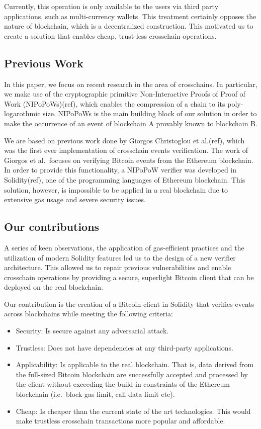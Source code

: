Currently, this operation is only available to the users via third party
applications, such as multi-currency wallets. This treatment certainly
opposes the nature of blockchain, which is a decentralized construction.
This motivated us to create a solution that enables cheap, trust-less
crosschain operations.

\subsection{Previous Work}

In this paper, we focus on recent research in the area of crosschains.
In particular, we make use of the cryptographic primitive
Non-Interactive Proofs of Proof of Work (NIPoPoWs)(ref), which enables
the compression of a chain to its poly-logarothmic size. NIPoPoWs is the
main building block of our solution in order to make the occurrence of
an event of blockchain A provably known to blockchain B.

We are based on previous work done by Giorgos Christoglou et al.(ref),
which was the first ever implementation of crosschain events
verification. The work of Giorgos et al.\ focuses on verifying Bitcoin
events from the Ethereum blockchain. In order to provide this
functionality, a NIPoPoW verifier was developed in Solidity(ref), one of
the programming languages of Ethereum blockchain. This solution,
however, is impossible to be applied in a real blockchain due to
extensive gas usage and severe security issues.

\subsection{Our contributions}

A series of keen observations, the application of gas-efficient
practices and the utilization of modern Solidity features led us to the
design of a new verifier architecture. This allowed us to repair
previous vulnerabilities and enable crosschain operations by providing a
secure, superlight Bitcoin client that can be deployed on the real
blockchain.

Our contribution is the creation of a Bitcoin client in Solidity that
verifies events across blockchains while meeting the following criteria:
\begin{itemize}
    \item
        Security: Is secure against any adversarial attack.
    \item
        Trustless: Does not have dependencies at any third-party applications.
    \item
        Applicability: Is applicable to the real blockchain. That is, data
        derived from the full-sized Bitcoin blockchain are successfully
        accepted and processed by the client without exceeding the build-in
        constraints of the Ethereum blockchain (i.e.\ block gas limit, call
        data limit etc).
    \item
        Cheap: Is cheaper than the current state of the art technologies. This
        would make trustless crosschain transactions more popular and
        affordable.
\end{itemize}

\pagebreak
